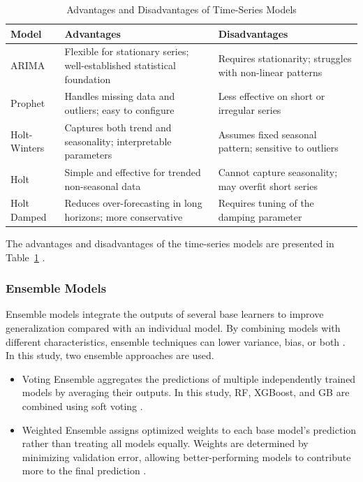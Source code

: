 \documentclass[final, 9pt, twocolumn]{saucis}
\begin{document}
\begin{table}[htbp]
\centering
\caption{Advantages and Disadvantages of Time-Series Models}
\label{tab:timeseries_pros_cons}
\small
\begin{tabular}{p{0.9cm} p{3.3cm} p{3.3cm}}
\hline
Model & Advantages & Disadvantages \\
\hline
ARIMA
& Flexible for stationary series; well-established statistical foundation
& Requires stationarity; struggles with non-linear patterns \\
Prophet
& Handles missing data and outliers; easy to configure
& Less effective on short or irregular series \\
Holt-Winters
& Captures both trend and seasonality; interpretable parameters
& Assumes fixed seasonal pattern; sensitive to outliers \\
Holt
& Simple and effective for trended non-seasonal data
& Cannot capture seasonality; may overfit short series \\
Holt Damped
& Reduces over-forecasting in long horizons; more conservative
& Requires tuning of the damping parameter \\
\hline
\end{tabular}
\end{table}

The advantages and disadvantages of the time-series models are presented in Table~\ref{tab:timeseries_pros_cons} .

\subsubsection{Ensemble Models}

Ensemble models integrate the outputs of several base learners to improve generalization compared with an individual model. By combining models with different characteristics, ensemble techniques can lower variance, bias, or both \cite{method15}. In this study, two ensemble approaches are used.

\begin{itemize}
    \item Voting Ensemble aggregates the predictions of 
    multiple independently trained models by averaging their outputs. In this study, RF, XGBoost, and GB are combined using soft voting \cite{method15}.

    \item Weighted Ensemble assigns optimized weights 
    to each base model's prediction rather than treating all 
    models equally. Weights are determined by minimizing 
    validation error, allowing better-performing models to 
    contribute more to the final prediction \cite{method16}.
\end{itemize}
\end{document}
